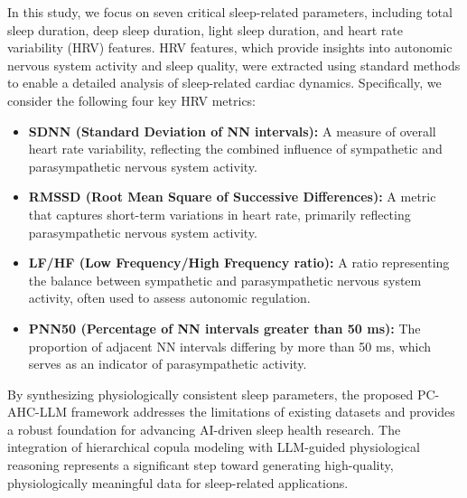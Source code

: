 \documentclass[preprint,12pt]{elsarticle}
\begin{document}
In this study, we focus on seven critical sleep-related parameters, including total sleep duration, deep sleep duration, light sleep duration, and heart rate variability (HRV) features. HRV features, which provide insights into autonomic nervous system activity and sleep quality, were extracted using standard methods to enable a detailed analysis of sleep-related cardiac dynamics. Specifically, we consider the following four key HRV metrics:
\begin{itemize}
    \item \textbf{SDNN (Standard Deviation of NN intervals):} A measure of overall heart rate variability, reflecting the combined influence of sympathetic and parasympathetic nervous system activity.
    \item \textbf{RMSSD (Root Mean Square of Successive Differences):} A metric that captures short-term variations in heart rate, primarily reflecting parasympathetic nervous system activity.
    \item \textbf{LF/HF (Low Frequency/High Frequency ratio):} A ratio representing the balance between sympathetic and parasympathetic nervous system activity, often used to assess autonomic regulation.
    \item \textbf{PNN50 (Percentage of NN intervals greater than 50 ms):} The proportion of adjacent NN intervals differing by more than 50 ms, which serves as an indicator of parasympathetic activity.
\end{itemize}

By synthesizing physiologically consistent sleep parameters, the proposed PC-AHC-LLM framework addresses the limitations of existing datasets and provides a robust foundation for advancing AI-driven sleep health research. The integration of hierarchical copula modeling with LLM-guided physiological reasoning represents a significant step toward generating high-quality, physiologically meaningful data for sleep-related applications.
\end{document}
